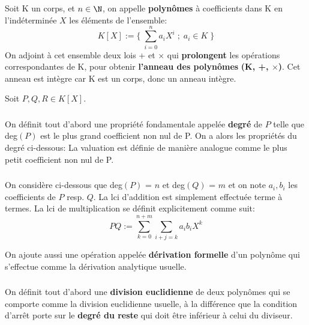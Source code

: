 \chapter*{}
Soit K un corps, et \(n \in \N\), on appelle \textbf{polynômes} à coefficients dans K en l'indéterminée \(X\) les éléments de l'ensemble:
\[
   K[X] := \Biggl\{ \; \sum_{i=0}^n a_{i}X^{i} \; ; \; a_i \in K \;\Biggl\}
\]
On adjoint à cet ensemble deux lois + et \(\times\) qui \textbf{prolongent} les opérations correspondantes de K, pour obtenir \textbf{l'anneau des polynômes} \textbf{(K, +, \(\times\))}. Cet anneau est intègre car K est un corps, donc un anneau intègre.\<

Soit \(P, Q, R \in K[X]\).

\subsection*{}
On définit tout d'abord une propriété fondamentale appelée \textbf{degré} de \(P\) telle que deg\((P)\) est le plus grand coefficient non nul de P.
On a alors les propriétés du degré ci-dessous:
La valuation est définie de manière analogue comme le plus petit coefficient non nul de P.
\subsection*{}
On considère ci-dessous que deg\((P)\) = \(n\) et deg\((Q)\) = \(m\) et on note \(a_i, b_i\) les coefficients de \(P\) resp. \(Q\).\+
La lci d'addition est simplement effectuée terme à termes.\+
La lci de multiplication se définit explicitement comme suit:
\[
   PQ := \sum_{k=0}^{n+m}\sum_{i+j = k} a_{i}b_{i}X^{k}
\]

On ajoute aussi une opération appelée \textbf{dérivation formelle} d'un polynôme qui s'effectue comme la dérivation analytique usuelle.
\subsection*{}
On définit tout d'abord une \textbf{division euclidienne} de deux polynômes qui se comporte comme la division euclidienne usuelle, à la différence que la condition d'arrêt porte sur le \textbf{degré du reste} qui doit être inférieur à celui du diviseur.\<

